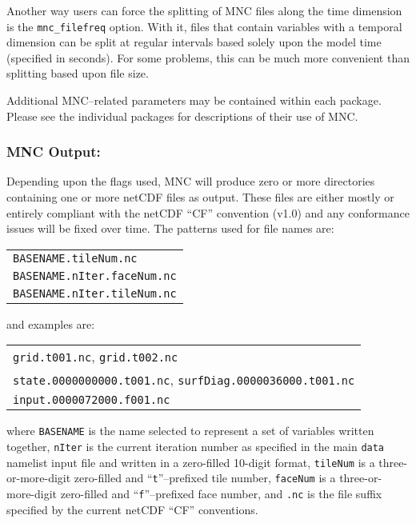 Another way users can force the splitting of MNC files along the time
dimension is the \texttt{mnc\_filefreq} option.  With it, files that
contain variables with a temporal dimension can be split at regular
intervals based solely upon the model time (specified in seconds).
For some problems, this can be much more convenient than splitting
based upon file size.

Additional MNC--related parameters may be contained within each
package.  Please see the individual packages for descriptions of their
use of MNC.


\subsubsection{MNC Output:}

Depending upon the flags used, MNC will produce zero or more
directories containing one or more netCDF files as output.  These
files are either mostly or entirely compliant with the netCDF ``CF''
convention (v1.0) and any conformance issues will be fixed over time.
The patterns used for file names are:
\begin{center}
  {\footnotesize
    \begin{tabular}[htb]{l}
      \texttt{BASENAME.tileNum.nc}  \\
      \texttt{BASENAME.nIter.faceNum.nc}  \\
      \texttt{BASENAME.nIter.tileNum.nc}
    \end{tabular}
  }
\end{center}
and examples are:
\begin{center}
  {\footnotesize
    \begin{tabular}[htb]{l}
      \texttt{grid.t001.nc}, \texttt{grid.t002.nc}  \\
      \texttt{state.0000000000.t001.nc},
      \texttt{surfDiag.0000036000.t001.nc}  \\
      \texttt{input.0000072000.f001.nc}
    \end{tabular}
  }
\end{center}
where \texttt{BASENAME} is the name selected to represent a set of
variables written together, \texttt{nIter} is the current iteration
number as specified in the main \texttt{data} namelist input file and
written in a zero-filled 10-digit format, \texttt{tileNum} is a
three-or-more-digit zero-filled and ``\texttt{t}''--prefixed tile
number, \texttt{faceNum} is a three-or-more-digit zero-filled and
``\texttt{f}''--prefixed face number, and \texttt{.nc} is the file
suffix specified by the current netCDF ``CF'' conventions.


